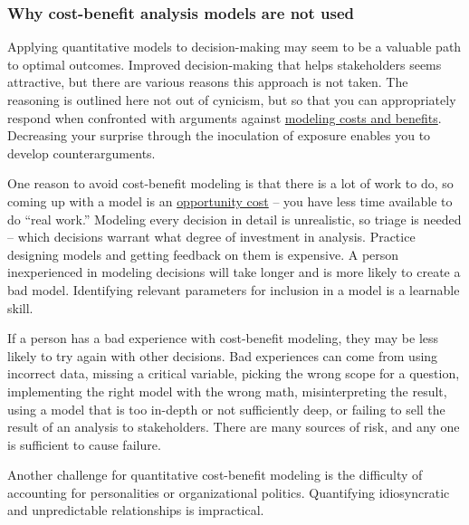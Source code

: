 \subsubsection*{Why cost-benefit analysis models are not used}

Applying quantitative models to decision-making may seem to be a valuable path to optimal outcomes. 
Improved decision-making that helps stakeholders seems attractive, but there are various reasons this approach is not taken. 
The reasoning is outlined here not out of cynicism, but so that you can appropriately respond when confronted with arguments against \href{https://en.wikipedia.org/wiki/Cost\%E2\%80\%93benefit_analysis}{modeling costs and benefits}.\iftoggle{WPinmargin}{\marginpar{$>$Wikipedia: cost-benefit modeling}}{}
%
Decreasing your surprise through the inoculation of exposure enables you to develop counterarguments. 

One reason to avoid cost-benefit modeling is that there is a lot of work to do, so coming up with a model is an \href{https://en.wikipedia.org/wiki/Opportunity_cost}{opportunity cost} -- you have less time available to do ``real work.'' 
\iftoggle{WPinmargin}{\marginpar{$>$Wikipedia: opportunity cost}}{}
Modeling every decision in detail is unrealistic, so triage is needed -- which decisions warrant what degree of investment in analysis. 
Practice designing models and getting feedback on them is expensive. 
A person inexperienced in modeling decisions will take longer and is more likely to create a bad model. 
Identifying relevant parameters for inclusion in a model is a learnable skill. 

If a person has a bad experience with cost-benefit modeling, they may be less likely to try again with other decisions. Bad experiences can come from using incorrect data, missing a critical variable, picking the wrong scope for a question, implementing the right model with the wrong math, misinterpreting the result, using a model that is too in-depth or not sufficiently deep, or failing to sell the result of an analysis to stakeholders. There are many sources of risk, and any one is sufficient to cause failure.

Another challenge for quantitative cost-benefit modeling is the difficulty of accounting for personalities or organizational politics. Quantifying idiosyncratic and unpredictable relationships is impractical. %

